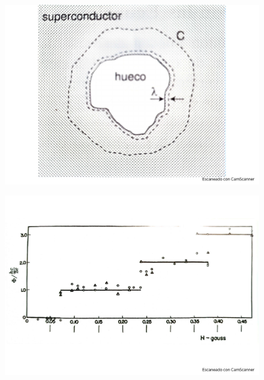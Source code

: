 \begin{figure}[h!] \centering
	\includegraphics[scale=0.5]{Cuerpo/Ch_11/Fotos libro 11.pdf}
	\caption{}
	\label{Fig:11-11}
\end{figure}
\begin{figure}[h!] \centering
	\includegraphics[scale=0.5]{Cuerpo/Ch_11/Fotos libro 12.pdf}
	\caption{}
	\label{Fig:11-12}
\end{figure}
